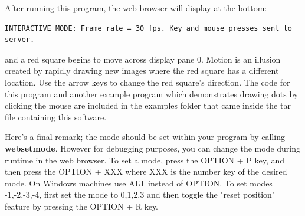 After running this program, the web browser will display at the bottom:
\begin{verbatim}
INTERACTIVE MODE: Frame rate = 30 fps. Key and mouse presses sent to server.
\end{verbatim}
and a red square begins to move across display pane 0. Motion is an illusion created by rapidly drawing new images where the 
red square has a different location. Use the arrow keys to change the red square's direction.
The code for this program and another example program which demonstrates drawing dots 
by clicking the mouse are included in the examples folder that came inside the tar file containing this software.

Here's a final remark; the mode should be set within your program by calling \textbf{websetmode}. However for debugging purposes, you can change the
mode during runtime in the web browser. To set a mode, press the OPTION + P key, and then press the OPTION + XXX
where XXX is the number key of the desired mode. On Windows machines use ALT instead of OPTION. To set modes -1,-2,-3,-4, first set the 
mode to 0,1,2,3 and then toggle the "reset position" feature by pressing the OPTION + R key. 
